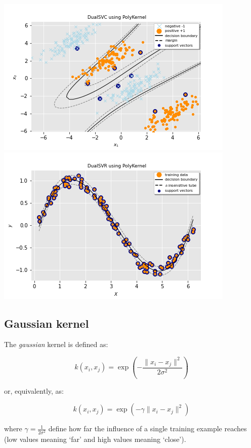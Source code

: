 \includegraphics[scale=0.5]{img/poly_dual_svc_hyperplane.png}
\includegraphics[scale=0.5]{img/poly_dual_svr_hyperplane.png}

\subsection{Gaussian kernel}

The \emph{gaussian} kernel is defined as:

\begin{equation} \label{eq:gaussian_kernel1}
	k(x_i,x_j)=\exp(-\frac{\|x_i-x_j\|^2}{2\sigma^2})
\end{equation}

or, equivalently, as:

\begin{equation} \label{eq:gaussian_kernel2}
	k(x_i,x_j)=\exp(-\gamma \|x_i-x_j\|^2)
\end{equation}

where $\displaystyle \gamma=\frac{1}{2\sigma^2}$ define how far the influence of a single training example reaches (low values meaning ‘far’ and high values meaning ‘close’).

